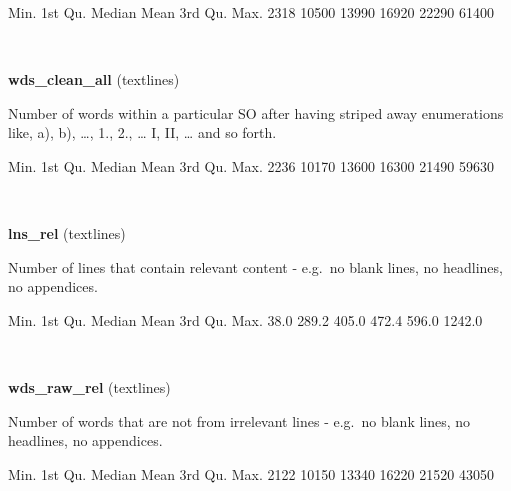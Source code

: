 \documentclass[]{article}
\newenvironment{Shaded}{\begin{snugshade}}{\end{snugshade}}
\newcommand{\DecValTok}[1]{\textcolor[rgb]{0.00,0.00,0.81}{{#1}}}
\newcommand{\FloatTok}[1]{\textcolor[rgb]{0.00,0.00,0.81}{{#1}}}
\newcommand{\NormalTok}[1]{{#1}}
\begin{document}
\begin{Shaded}
\begin{Highlighting}[]
   \NormalTok{Min. 1st Qu.  Median    Mean 3rd Qu.    Max. }
   \DecValTok{2318}   \DecValTok{10500}   \DecValTok{13990}   \DecValTok{16920}   \DecValTok{22290}   \DecValTok{61400} 
\end{Highlighting}
\end{Shaded}

~

\vspace{1em}

\textbf{wds\_clean\_all} (textlines)

Number of words within a particular SO after having striped away
enumerations like, a), b), \ldots{}, 1., 2., \ldots{} I, II, \ldots{}
and so forth.

\begin{Shaded}
\begin{Highlighting}[]
   \NormalTok{Min. 1st Qu.  Median    Mean 3rd Qu.    Max. }
   \DecValTok{2236}   \DecValTok{10170}   \DecValTok{13600}   \DecValTok{16300}   \DecValTok{21490}   \DecValTok{59630} 
\end{Highlighting}
\end{Shaded}

~

\vspace{1em}

\textbf{lns\_rel} (textlines)

Number of lines that contain relevant content - e.g.~no blank lines, no
headlines, no appendices.

\begin{Shaded}
\begin{Highlighting}[]
   \NormalTok{Min. 1st Qu.  Median    Mean 3rd Qu.    Max. }
   \FloatTok{38.0}   \FloatTok{289.2}   \FloatTok{405.0}   \FloatTok{472.4}   \FloatTok{596.0}  \FloatTok{1242.0} 
\end{Highlighting}
\end{Shaded}

~

\vspace{1em}

\textbf{wds\_raw\_rel} (textlines)

Number of words that are not from irrelevant lines - e.g.~no blank
lines, no headlines, no appendices.

\begin{Shaded}
\begin{Highlighting}[]
   \NormalTok{Min. 1st Qu.  Median    Mean 3rd Qu.    Max. }
   \DecValTok{2122}   \DecValTok{10150}   \DecValTok{13340}   \DecValTok{16220}   \DecValTok{21520}   \DecValTok{43050} 
\end{Highlighting}
\end{Shaded}
\end{document}
